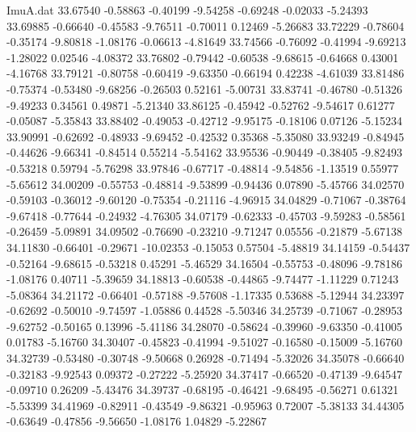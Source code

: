 \begin{filecontents}{ImuA.dat}
  33.67540   -0.58863   -0.40199   -9.54258   -0.69248   -0.02033   -5.24393
  33.69885   -0.66640   -0.45583   -9.76511   -0.70011    0.12469   -5.26683
  33.72229   -0.78604   -0.35174   -9.80818   -1.08176   -0.06613   -4.81649
  33.74566   -0.76092   -0.41994   -9.69213   -1.28022    0.02546   -4.08372
  33.76802   -0.79442   -0.60538   -9.68615   -0.64668    0.43001   -4.16768
  33.79121   -0.80758   -0.60419   -9.63350   -0.66194    0.42238   -4.61039
  33.81486   -0.75374   -0.53480   -9.68256   -0.26503    0.52161   -5.00731
  33.83741   -0.46780   -0.51326   -9.49233    0.34561    0.49871   -5.21340
  33.86125   -0.45942   -0.52762   -9.54617    0.61277   -0.05087   -5.35843
  33.88402   -0.49053   -0.42712   -9.95175   -0.18106    0.07126   -5.15234
  33.90991   -0.62692   -0.48933   -9.69452   -0.42532    0.35368   -5.35080
  33.93249   -0.84945   -0.44626   -9.66341   -0.84514    0.55214   -5.54162
  33.95536   -0.90449   -0.38405   -9.82493   -0.53218    0.59794   -5.76298
  33.97846   -0.67717   -0.48814   -9.54856   -1.13519    0.55977   -5.65612
  34.00209   -0.55753   -0.48814   -9.53899   -0.94436    0.07890   -5.45766
  34.02570   -0.59103   -0.36012   -9.60120   -0.75354   -0.21116   -4.96915
  34.04829   -0.71067   -0.38764   -9.67418   -0.77644   -0.24932   -4.76305
  34.07179   -0.62333   -0.45703   -9.59283   -0.58561   -0.26459   -5.09891
  34.09502   -0.76690   -0.23210   -9.71247    0.05556   -0.21879   -5.67138
  34.11830   -0.66401   -0.29671  -10.02353   -0.15053    0.57504   -5.48819
  34.14159   -0.54437   -0.52164   -9.68615   -0.53218    0.45291   -5.46529
  34.16504   -0.55753   -0.48096   -9.78186   -1.08176    0.40711   -5.39659
  34.18813   -0.60538   -0.44865   -9.74477   -1.11229    0.71243   -5.08364
  34.21172   -0.66401   -0.57188   -9.57608   -1.17335    0.53688   -5.12944
  34.23397   -0.62692   -0.50010   -9.74597   -1.05886    0.44528   -5.50346
  34.25739   -0.71067   -0.28953   -9.62752   -0.50165    0.13996   -5.41186
  34.28070   -0.58624   -0.39960   -9.63350   -0.41005    0.01783   -5.16760
  34.30407   -0.45823   -0.41994   -9.51027   -0.16580   -0.15009   -5.16760
  34.32739   -0.53480   -0.30748   -9.50668    0.26928   -0.71494   -5.32026
  34.35078   -0.66640   -0.32183   -9.92543    0.09372   -0.27222   -5.25920
  34.37417   -0.66520   -0.47139   -9.64547   -0.09710    0.26209   -5.43476
  34.39737   -0.68195   -0.46421   -9.68495   -0.56271    0.61321   -5.53399
  34.41969   -0.82911   -0.43549   -9.86321   -0.95963    0.72007   -5.38133
  34.44305   -0.63649   -0.47856   -9.56650   -1.08176    1.04829   -5.22867

\end{filecontents}
